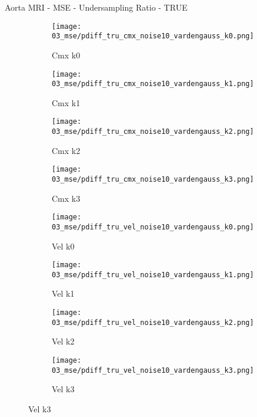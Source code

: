 \documentclass{beamer}
\begin{document}
\begin{frame}{Aorta MRI - MSE - Undersampling Ratio - TRUE}{}
\begin{figure}
\begin{subfigure}{0.24\textwidth}
\texttt{[image: 03\_mse/pdiff\_tru\_cmx\_noise10\_vardengauss\_k0.png]}
\vspace{-20pt}
\caption*{\tiny Cmx k0}
\end{subfigure}
\begin{subfigure}{0.24\textwidth}
\texttt{[image: 03\_mse/pdiff\_tru\_cmx\_noise10\_vardengauss\_k1.png]}
\vspace{-20pt}
\caption*{\tiny Cmx k1}
\end{subfigure}
\begin{subfigure}{0.24\textwidth}
\texttt{[image: 03\_mse/pdiff\_tru\_cmx\_noise10\_vardengauss\_k2.png]}
\vspace{-20pt}
\caption*{\tiny Cmx k2}
\end{subfigure}
\begin{subfigure}{0.24\textwidth}
\texttt{[image: 03\_mse/pdiff\_tru\_cmx\_noise10\_vardengauss\_k3.png]}
\vspace{-20pt}
\caption*{\tiny Cmx k3}
\end{subfigure}

\begin{subfigure}{0.24\textwidth}
\texttt{[image: 03\_mse/pdiff\_tru\_vel\_noise10\_vardengauss\_k0.png]}
\vspace{-20pt}
\caption*{\tiny Vel k0}
\end{subfigure}
\begin{subfigure}{0.24\textwidth}
\texttt{[image: 03\_mse/pdiff\_tru\_vel\_noise10\_vardengauss\_k1.png]}
\vspace{-20pt}
\caption*{\tiny Vel k1}
\end{subfigure}
\begin{subfigure}{0.24\textwidth}
\texttt{[image: 03\_mse/pdiff\_tru\_vel\_noise10\_vardengauss\_k2.png]}
\vspace{-20pt}
\caption*{\tiny Vel k2}
\end{subfigure}
\begin{subfigure}{0.24\textwidth}
\texttt{[image: 03\_mse/pdiff\_tru\_vel\_noise10\_vardengauss\_k3.png]}
\vspace{-20pt}
\caption*{\tiny Vel k3}
\end{subfigure}
\end{figure}
\end{frame}
\end{document}

